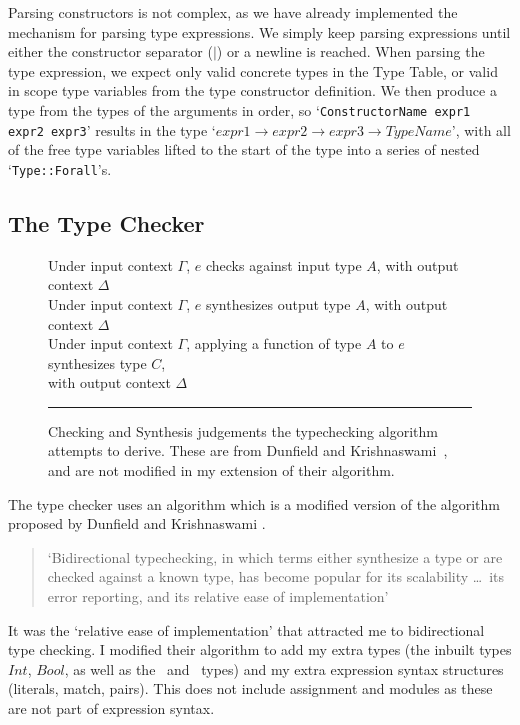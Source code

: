 Parsing constructors is not complex, as we have already implemented the mechanism for parsing type expressions. We simply keep parsing expressions until either the constructor separator ($\mid$) or a newline is reached. When parsing the type expression, we expect only valid concrete types in the Type Table, or valid in scope type variables from the type constructor definition. We then produce a type from the types of the arguments in order, so `\verb|ConstructorName expr1 expr2 expr3|' results in the type `\(expr1  \rightarrow expr2 \rightarrow expr3 \rightarrow  TypeName\)', with all of the free type variables lifted to the start of the type into a series of nested `\verb|Type::Forall|'s.

\newpage
\subsection{The Type Checker}
\begin{figure}[t]
    \begin{minipage}{1\textwidth}
    {Under input context $\Gamma$, $e$ checks against input type $A$, 
    with output context $\Delta$} \\[1ex]
    {Under input context $\Gamma$, $e$ synthesizes output type $A$,
      with output context $\Delta$} \\[0.5ex]
    {Under input context $\Gamma$, applying a function of type $A$ to $e$ synthesizes type $C$, \\ with output context $\Delta$} \\
    \end{minipage}
    \noindent\rule{\textwidth}{0.4pt}
    \caption{Checking and Synthesis judgements the typechecking algorithm attempts to derive. These are from Dunfield and Krishnaswami~\cite{completebidir}, and are not modified in my extension of their algorithm.}
    \label{fig:bidir_judgement_types}
\end{figure}

The type checker uses an algorithm which is a modified version of the algorithm proposed by Dunfield and Krishnaswami \cite{completebidir}. 
\begin{quote}
`Bidirectional typechecking, in which terms either synthesize a type or are checked against a known type, has become popular for its scalability \ldots\ its error reporting, and its relative ease of implementation' \cite{completebidir}
\end{quote}
\noindent It was the `relative ease of implementation' that attracted me to bidirectional type checking. I modified their algorithm to add my extra types (the inbuilt types $Int$, $Bool$, as well as the \Uniontype\ and \Producttype\ types) and my extra expression syntax structures (literals, match, pairs). This does not include assignment and modules as these are not part of expression syntax. 

